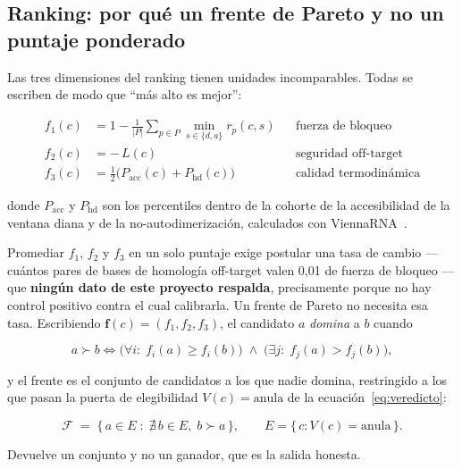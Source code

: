 \documentclass[11pt,a4paper]{article}
\begin{document}
\subsection{Ranking: por qué un frente de Pareto y no un puntaje ponderado}
\label{sec:pareto}

Las tres dimensiones del ranking tienen unidades incomparables. Todas se escriben de modo que ``más
alto es mejor'':

\begin{align}
f_1(c) &= 1 - \frac{1}{|P|}\sum_{p \in P} \min_{s \in \{d,a\}} r_p(c,s)
        && \text{fuerza de bloqueo} \label{eq:f1}\\[0.2em]
f_2(c) &= -\,L(c)
        && \text{seguridad off-target} \label{eq:f2}\\[0.2em]
f_3(c) &= \tfrac{1}{2}\bigl(P_{\mathrm{acc}}(c) + P_{\mathrm{hd}}(c)\bigr)
        && \text{calidad termodinámica} \label{eq:f3}
\end{align}

donde $P_{\mathrm{acc}}$ y $P_{\mathrm{hd}}$ son los percentiles dentro de la cohorte de la
accesibilidad de la ventana diana y de la no-autodimerización, calculados con
ViennaRNA~\cite{lorenz2011}.

Promediar $f_1$, $f_2$ y $f_3$ en un solo puntaje exige postular una tasa de cambio --- cuántos pares
de bases de homología off-target valen 0,01 de fuerza de bloqueo --- que \textbf{ningún dato de este
proyecto respalda}, precisamente porque no hay control positivo contra el cual calibrarla. Un frente
de Pareto no necesita esa tasa. Escribiendo $\bm{f}(c) = (f_1,f_2,f_3)$, el candidato $a$
\emph{domina} a $b$ cuando

\begin{equation}
a \succ b
\iff
\bigl(\forall i:\; f_i(a) \ge f_i(b)\bigr)
\;\wedge\;
\bigl(\exists j:\; f_j(a) > f_j(b)\bigr),
\label{eq:dominancia}
\end{equation}

y el frente es el conjunto de candidatos a los que nadie domina, restringido a los que pasan la
puerta de elegibilidad $V(c)=\text{anula}$ de la ecuación~\ref{eq:veredicto}:

\begin{equation}
\mathcal{F} \;=\; \bigl\{\, a \in E \;:\; \nexists\, b \in E,\; b \succ a \,\bigr\},
\qquad
E = \{\,c : V(c) = \text{anula}\,\}.
\label{eq:frente}
\end{equation}

Devuelve un conjunto y no un ganador, que es la salida honesta.
\end{document}
